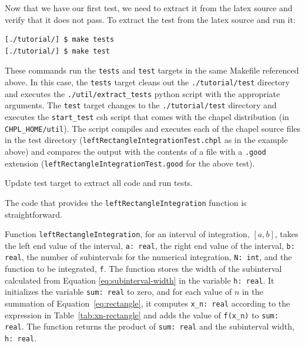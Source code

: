 \begin{seamlessnote}
Now that we have our first test, we need to extract it from the latex source and verify
that it does not pass.
To extract the test from the latex source and run it:
\begin{verbatim}
[./tutorial/] $ make tests
[./tutorial/] $ make test
\end{verbatim}
These commands run the \lstinline{tests} and \lstinline{test} targets in the same Makefile referenced above.
In this case, the \lstinline{tests} target cleans out the \lstinline{./tutorial/test} directory and
executes the \lstinline{./util/extract_tests} python script with the appropriate arguments.
The \lstinline{test} target changes to the \lstinline{./tutorial/test} directory and 
executes the \lstinline{start_test} csh script that comes with
the chapel distribution (in \lstinline{CHPL_HOME/util}). The script compiles and executes each of the
chapel source files in the test directory 
(\eg \lstinline{leftRectangleIntegrationTest.chpl} as in the example above) 
and compares the output with the contents of a file with a \lstinline{.good} extension
(\eg \lstinline{leftRectangleIntegrationTest.good} for the above test). 
\end{seamlessnote}
\begin{TODO}
  Update test target to extract all code and run tests.
\end{TODO}

The code that provides the \lstinline{leftRectangleIntegration} function is straightforward.
\begin{enumspec}
\item{} Function \lstinline{leftRectangleIntegration}, for an interval
  of integration, $[a,b]$,
  takes the left end value of the interval, \lstinline{a: real}, the right end value
  of the interval, \lstinline{b: real}, the number of subintervals for the numerical
  integration, \lstinline{N: int}, and the function to be integrated, \lstinline{f}.
  The function stores the width of the subinterval calculated from Equation 
  \ref{eq:subinterval-width} in the variable \lstinline{h: real}. It initializes the variable
  \lstinline{sum: real} to zero, and for each value of $n$ in the summation of Equation~\ref{eq:rectangle},
  it computes \lstinline{x_n: real} according to the expression in Table~\ref{tab:xn-rectangle} and adds
  the value of \lstinline{f(x_n)} to \lstinline{sum: real}. The function returns the product of 
  \lstinline{sum: real} and the subinterval width, \lstinline{h: real}.
\end{enumspec}


